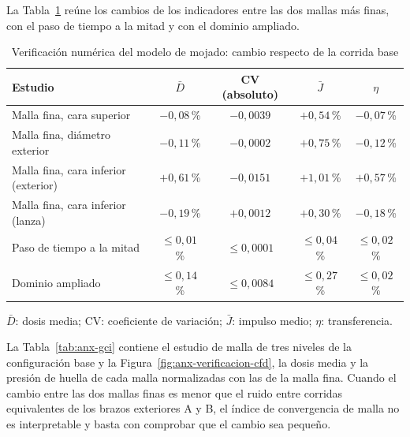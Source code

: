 La Tabla~\ref{tab:verificacion-cfd} reúne los cambios de los indicadores entre las dos mallas más finas, con el paso de tiempo a la mitad y con el dominio ampliado.

\begin{table}[htbp]
\centering\small\singlespacing
\caption{Verificación numérica del modelo de mojado: cambio respecto de la corrida base}
\label{tab:verificacion-cfd}
\begin{tabular}{lcccc}
\toprule
\textbf{Estudio} & \textbf{$\bar D$} & \textbf{CV (absoluto)} & \textbf{$\bar J$} & \textbf{$\eta$}\\
\midrule
Malla fina, cara superior & $-0{,}08$\,\% & $-0{,}0039$ & $+0{,}54$\,\% & $-0{,}07$\,\%\\
Malla fina, diámetro exterior & $-0{,}11$\,\% & $-0{,}0002$ & $+0{,}75$\,\% & $-0{,}12$\,\%\\
Malla fina, cara inferior (exterior) & $+0{,}61$\,\% & $-0{,}0151$ & $+1{,}01$\,\% & $+0{,}57$\,\%\\
Malla fina, cara inferior (lanza) & $-0{,}19$\,\% & $+0{,}0012$ & $+0{,}30$\,\% & $-0{,}18$\,\%\\
Paso de tiempo a la mitad & $\leq0{,}01$\,\% & $\leq0{,}0001$ & $\leq0{,}04$\,\% & $\leq0{,}02$\,\%\\
Dominio ampliado & $\leq0{,}14$\,\% & $\leq0{,}0084$ & $\leq0{,}27$\,\% & $\leq0{,}02$\,\%\\
\bottomrule
\end{tabular}
\par\smallskip\footnotesize
$\bar D$: dosis media; CV: coeficiente de variación; $\bar J$: impulso medio; $\eta$: transferencia.
\end{table}

La Tabla~\ref{tab:anx-gci} contiene el estudio de malla de tres niveles de la configuración base y la Figura~\ref{fig:anx-verificacion-cfd}, la dosis media y la presión de huella de cada malla normalizadas con las de la malla fina. Cuando el cambio entre las dos mallas finas es menor que el ruido entre corridas equivalentes de los brazos exteriores A y B, el índice de convergencia de malla no es interpretable y basta con comprobar que el cambio sea pequeño.

